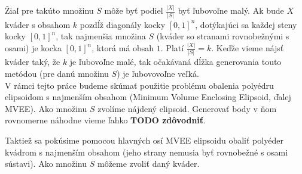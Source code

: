 Žiaľ pre takúto množinu $S$ môže byť podiel $\frac{|X|}{|S|}$ byť ľubovoľne malý. Ak bude $X$ kváder s obsahom $k$ pozdĺž diagonály kocky $[0,1]^n$, dotýkajúci sa každej steny kocky $[0,1]^n$, tak najmenšia množina $S$ (kváder so stranami rovnobežnými s osami) je kocka $[0,1]^n$, ktorá má obsah $1$. Platí $\frac{|X|}{|S|}=k$. Keďže vieme nájsť kváder taký, že $k$ je ľubovoľne malé, tak očakávaná dĺžka generovania touto metódou (pre danú množinu $S$) je ľubovovoľne veľká.\\

V rámci tejto práce budeme skúmať použitie problému obalenia polyédru elipsoidom s najmenším obsahom (Minimum Volume Enclosing Elipsoid, ďalej MVEE). Ako množinu $S$ zvolíme nájdený elipsoid. Generovať body v ňom rovnomerne náhodne vieme ľahko \textbf{TODO zdôvodniť}.

Taktiež sa pokúsime pomocou hlavných osí MVEE elipsoidu obaliť polyéder kvádrom s najmenším obsahom (jeho strany nemusia byť rovnobežné s osami sústavi). Ako množinu $S$ môžeme zvoliť daný kváder.

